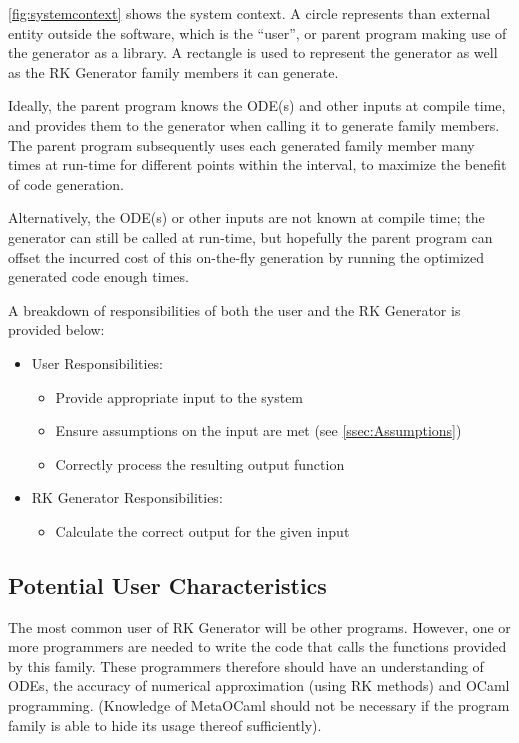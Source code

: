 \documentclass[12pt]{article}
\newcommand{\famname}{RK Generator} %
\begin{document}
\autoref{fig:systemcontext} shows the system context. A circle represents than 
external entity outside the software, which is the ``user'', or parent program 
making use of the generator as a library. A rectangle is used to represent the 
generator as well as the \famname{} family members it can generate. 

Ideally, the parent program knows the ODE(s) and other inputs at compile time, 
and provides them to the generator when calling it to generate family members.
The parent program subsequently uses each generated family member many times at 
run-time for different points within the interval, to maximize the benefit of 
code generation.

Alternatively, the ODE(s) or other inputs are not known at compile time; the 
generator can still be called at run-time, but hopefully the parent program can 
offset the incurred cost of this on-the-fly generation by running the optimized 
generated code enough times.

A breakdown of responsibilities of both the user and the \famname{} is provided 
below:
\begin{itemize}
\item User Responsibilities:
\begin{itemize}
\item Provide appropriate input to the system
\item Ensure assumptions on the input are met (see \autoref{ssec:Assumptions})
\item Correctly process the resulting output function
\end{itemize}
\item \famname{} Responsibilities:
\begin{itemize}
\item Calculate the correct output for the given input
\end{itemize}
\end{itemize}

\subsection{Potential User Characteristics} \label{SecUserCharacteristics}

The most common user of \famname{} will be other programs. However, one or more 
programmers are needed to write the code that calls the functions provided by 
this family.
These programmers therefore should have an understanding of ODEs, the accuracy 
of numerical approximation (using RK methods) and OCaml programming. (Knowledge 
of MetaOCaml should not be necessary 
if the program family is able to hide its usage thereof sufficiently).
                                                                                
\end{document}
